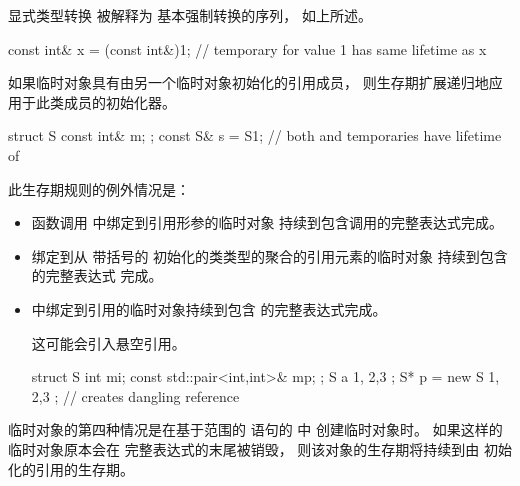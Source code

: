 \begin{note}
显式类型转换
被解释为
基本强制转换的序列，
如上所述。
\begin{example}
\begin{codeblock}
const int& x = (const int&)1;   // temporary for value 1 has same lifetime as x
\end{codeblock}
\end{example}
\end{note}
\begin{note}
如果临时对象具有由另一个临时对象初始化的引用成员，
则生存期扩展递归地应用于此类成员的初始化器。
\begin{example}
\begin{codeblock}
struct S {
  const int& m;
};
const S& s = S{1};              // both  and  temporaries have lifetime of 
\end{codeblock}
\end{example}
\end{note}

此生存期规则的例外情况是：
\begin{itemize}
\item 函数调用 中绑定到引用形参的临时对象
持续到包含调用的完整表达式完成。

\item 绑定到从
带括号的  初始化的类类型的聚合的引用元素的临时对象
持续到包含  的完整表达式
完成。

\item {} 中绑定到引用的临时对象持续到包含  的完整表达式完成。
\begin{note}
这可能会引入悬空引用。
\end{note}
\begin{example}
\begin{codeblock}
struct S { int mi; const std::pair<int,int>& mp; };
S a { 1, {2,3} };
S* p = new S{ 1, {2,3} };       // creates dangling reference
\end{codeblock}
\end{example}
\end{itemize}

\pnum
临时对象的第四种情况是在基于范围的  语句的  中
创建临时对象时。
如果这样的临时对象原本会在
 完整表达式的末尾被销毁，
则该对象的生存期将持续到由  初始化的引用的生存期。

